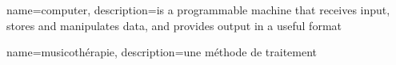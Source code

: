 {
  name=computer,
  description={is a programmable machine that receives input,
               stores and manipulates data, and provides
               output in a useful format}
}

{
  name=musicothérapie,
  description={une méthode de traitement}
}



